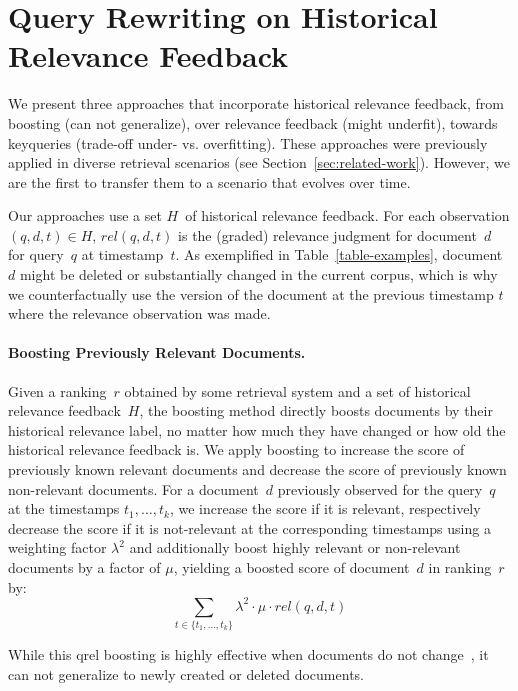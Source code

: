 \section{Query Rewriting on Historical Relevance Feedback}

We present three approaches that incorporate historical relevance feedback, from \Ni boosting (can not generalize), over \Nii relevance feedback (might underfit), towards \Niii keyqueries (trade-off under- vs. overfitting). These approaches were previously applied in diverse retrieval scenarios (see Section~\ref{sec:related-work}). However, we are the first to transfer them to a scenario that evolves over time.

Our approaches use a set $H$~of historical relevance feedback. For each observation $(q, d, t) \in H$, $rel(q, d, t)$ is the (graded) relevance judgment for document~$d$ for query~$q$ at timestamp~$t$. As exemplified in Table~\ref{table-examples}, document~$d$ might be deleted or substantially changed in the current corpus, which is why we counterfactually use the version of the document at the previous timestamp $t$ where the relevance observation was made.

\paragraph{Boosting Previously Relevant Documents.} Given a ranking~$r$ obtained by some retrieval system and a set of historical relevance feedback~$H$, the boosting method directly boosts documents by their historical relevance label, no matter how much they have changed or how old the historical relevance feedback is. We apply boosting to increase the score of previously known relevant documents and decrease the score of previously known non-relevant documents. For a document~$d$ previously observed for the query~$q$ at the timestamps $t_{1}, \ldots, t_{k}$, we increase the score if it is relevant, respectively decrease the score if it is not-relevant at the corresponding timestamps using a weighting factor $\lambda^2$ and additionally boost highly relevant or non-relevant documents by a factor of $\mu$, yielding a boosted score of document~$d$ in ranking~$r$ by:
\begin{equation}
\sum\limits_{t \in \{t_{1}, \ldots, t_{k}\}} \lambda^2 \cdot \mu \cdot rel(q,d,t)
\end{equation}

While this qrel boosting is highly effective when documents do not change~\cite{alkhalifa:2024,keller:2024b}, it can not generalize to newly created or deleted documents.


